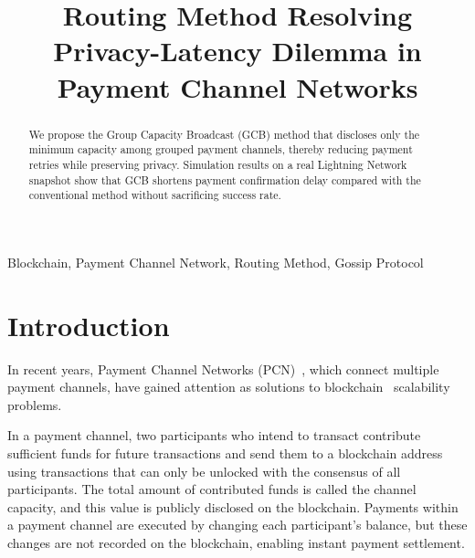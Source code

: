 \documentclass[conference]{IEEEtran}
\begin{document}
\title{Routing Method Resolving Privacy-Latency Dilemma in Payment Channel Networks}

\author{
	\and
}

\maketitle

\begin{abstract}
	We propose the Group Capacity Broadcast (GCB) method that discloses only the minimum capacity among grouped payment channels, thereby reducing payment retries while preserving privacy. Simulation results on a real Lightning Network snapshot show that GCB shortens payment confirmation delay compared with the conventional method without sacrificing success rate.
\end{abstract}

\begin{IEEEkeywords}
	Blockchain, Payment Channel Network, Routing Method, Gossip Protocol
\end{IEEEkeywords}

\section{Introduction}

In recent years, Payment Channel Networks (PCN)~\cite{poon_dryja_2016}, which connect multiple payment channels, have gained attention as solutions to blockchain~\cite{nakamoto2008bitcoin} scalability problems.

In a payment channel, two participants who intend to transact contribute sufficient funds for future transactions and send them to a blockchain address using transactions that can only be unlocked with the consensus of all participants. The total amount of contributed funds is called the channel capacity, and this value is publicly disclosed on the blockchain. Payments within a payment channel are executed by changing each participant's balance, but these changes are not recorded on the blockchain, enabling instant payment settlement.
\end{document}
